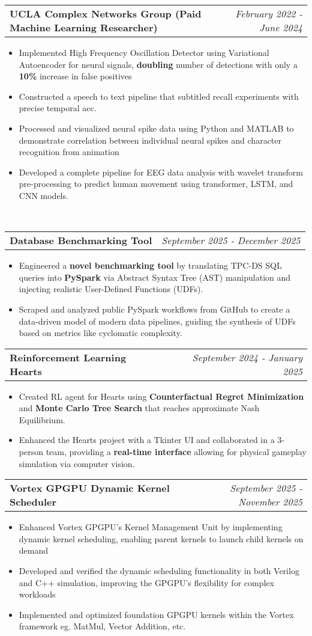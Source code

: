 \documentclass[letterpaper,11pt]{article}
\makeatletter
\newcommand{\resitem}[1]{\item #1 \vspace{-8pt}}
\newcommand{\resheading}[1]{\vspace{8pt}{\Large \textbf{#1}}\\\vspace{-8pt}\hrulefill}
\newcommand{\ressubheadingsmol}[2]{\vspace{1pt}
\begin{tabular*}{7.0in}{l@{\cftdotfill{\cftsecdotsep}\extracolsep{\fill}}r}
		\textbf{#1} & \textit{#2} \\
\end{tabular*}\vspace{-6pt}}
\makeatother
\begin{document}
\ressubheadingsmol{UCLA Complex Networks Group (Paid Machine Learning Researcher)}{February 2022 - June 2024}
\begin{itemize}
    \resitem{Implemented High Frequency Oscillation Detector using Variational Autoencoder for neural signals, \textbf{doubling} number of detections with only a \textbf{10\%} increase in false positives}
    \resitem{Constructed a speech to text pipeline that subtitled recall experiments with precise temporal acc.}
    \resitem{Processed and visualized neural spike data using Python and MATLAB to demonstrate correlation between individual neural spikes and character recognition from animation}
    \resitem{Developed a complete pipeline for EEG data analysis with wavelet transform pre-processing to predict human movement using transformer, LSTM, and CNN models.}

\end{itemize}


\resheading{Projects}
\ressubheadingsmol{Database Benchmarking Tool}{September 2025 - December 2025}
\begin{itemize}
    \resitem{Engineered a\textbf{ novel benchmarking tool} by translating TPC-DS SQL queries into \textbf{PySpark} via Abstract Syntax Tree (AST) manipulation and injecting realistic User-Defined Functions (UDFs).}
    \resitem{Scraped and analyzed public PySpark workflows from GitHub to create a data-driven model of modern data pipelines, guiding the synthesis of UDFs based on metrics like cyclomatic complexity.}
\end{itemize}
\ressubheadingsmol{Reinforcement Learning Hearts}{September 2024 - January 2025}
\begin{itemize}
    \resitem{Created RL agent for Hearts using \textbf{Counterfactual Regret Minimization} and \textbf{Monte Carlo Tree Search} that reaches approximate Nash Equilibrium.}
    \resitem{Enhanced the Hearts project with a Tkinter UI and collaborated in a 3-person team, providing a \textbf{real-time interface} allowing for physical gameplay simulation via computer vision.}
\end{itemize}
\ressubheadingsmol{Vortex GPGPU Dynamic Kernel Scheduler}{September 2025 - November 2025}
\begin{itemize}
    \resitem{Enhanced Vortex GPGPU's Kernel Management Unit by implementing dynamic kernel scheduling, enabling parent kernels to launch child kernels on demand}
    \resitem{Developed and verified the dynamic scheduling functionality in both Verilog and C++ simulation, improving the GPGPU's flexibility for complex workloads}
    \resitem{Implemented and optimized foundation GPGPU kernels within the Vortex framework eg. MatMul, Vector Addition, etc. }
\end{itemize}
\end{document}
